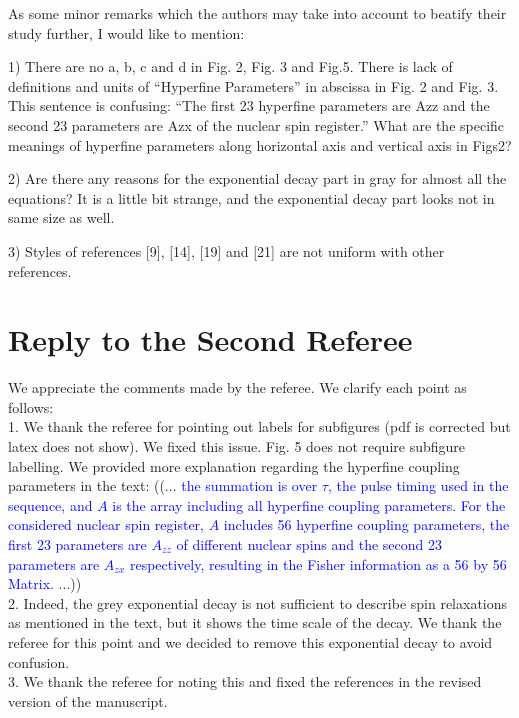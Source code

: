 \documentclass[12pt]{amsart}
\begin{document}
	As some minor remarks which the authors may take into account to
	beatify their study further, I would like to mention:
	
	1) There are no a, b, c and d in Fig. 2, Fig. 3 and Fig.5. There is
	lack of definitions and units of “Hyperfine Parameters” in abscissa in
	Fig. 2 and Fig. 3. This sentence is confusing: “The first 23 hyperfine
	parameters are Azz and the second 23 parameters are Azx of the nuclear
	spin register.” What are the specific meanings of hyperfine parameters
	along horizontal axis and vertical axis in Figs2?
	
	2) Are there any reasons for the exponential decay part in gray for
	almost all the equations? It is a little bit strange, and the
	exponential decay part looks not in same size as well.
	
	3) Styles of references [9], [14], [19] and [21] are not uniform with
	other references.
	
	\color{black} \section*{Reply to the Second Referee}
	We appreciate the comments made by the referee. We clarify each point as follows:\\
	1. We thank the referee for pointing out labels for subfigures (pdf is corrected but latex does not show). We fixed this issue. Fig. 5 does not require subfigure labelling. We provided more explanation regarding the hyperfine coupling parameters in the text:
	((... \textcolor{blue}{the summation is over $\tau$, the pulse timing used in the sequence, and $A$ is the array including all hyperfine coupling parameters. For the considered nuclear spin register, $A$ includes 56 hyperfine coupling parameters, the first 23 parameters are $A_{zz}$ of different nuclear spins and the second 23 parameters are $A_{zx}$ respectively, resulting in the Fisher information as a 56 by 56 Matrix.} ...)) \\   
	
	2. Indeed, the grey exponential decay is not sufficient to describe spin relaxations as mentioned in the text, but it shows the time scale of the decay. We thank the referee for this point and we decided to remove this exponential decay to avoid confusion.\\
	
	3. We thank the referee for noting this and fixed the references in the revised version of the manuscript. 
	
\end{document}
